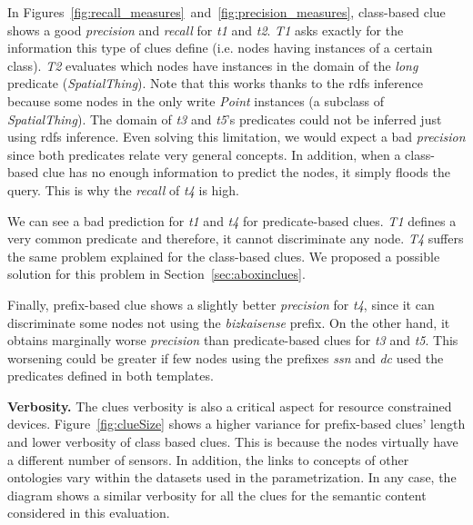 In Figures~\ref{fig:recall_measures}~and~\ref{fig:precision_measures}, class-based clue shows a good \emph{precision} and \emph{recall} for \emph{t1} and \emph{t2}.
\emph{T1} asks exactly for the information this type of clues define (i.e. nodes having instances of a certain class).
\emph{T2} evaluates which nodes have instances in the domain of the \emph{long} predicate (\emph{SpatialThing}).
Note that this works thanks to the \acs{rdfs} inference because some nodes in the \Space{} only write \emph{Point} instances (a subclass of \emph{SpatialThing}).
The domain of \emph{t3} and \emph{t5}'s predicates could not be inferred just using \acs{rdfs} inference. %
Even solving this limitation, we would expect a bad \emph{precision} since both predicates relate very general concepts.
In addition, when a class-based clue has no enough information to predict the nodes, it simply floods the query.
This is why the \emph{recall} of \emph{t4} is high.





We can see a bad prediction for \emph{t1} and \emph{t4} for predicate-based clues.
\emph{T1} defines a very common predicate and therefore, it cannot discriminate any node.
\emph{T4} suffers the same problem explained for the class-based clues.
We proposed a possible solution for this problem in Section~\ref{sec:aboxinclues}.

Finally, prefix-based clue shows a slightly better \emph{precision} for \emph{t4}, since it can discriminate some nodes not using the \emph{bizkaisense} prefix.
On the other hand, it obtains marginally worse \emph{precision} than predicate-based clues for \emph{t3} and \emph{t5}.
This worsening could be greater if few nodes using the prefixes \emph{ssn} and \emph{dc} used the predicates defined in both templates.

\medskip

\noindent\textbf{Verbosity.}
The clues verbosity is also a critical aspect for resource constrained devices.
Figure~\ref{fig:clueSize} shows a higher variance for prefix-based clues' length and lower verbosity of class based clues.
This is because the nodes virtually have a different number of sensors.
In addition, the links to concepts of other ontologies vary within the datasets used in the parametrization.
In any case, the diagram shows a similar verbosity for all the clues for the semantic content considered in this evaluation. %


